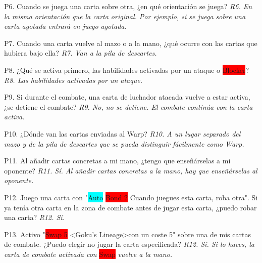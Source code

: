 \documentclass[10pt,a4paper]{article}
\begin{document}
\begin{shaded}
  P6. Cuando se juega una carta sobre otra, ¿en qué orientación se juega? \newline
  \emph{R6. En la misma orientación que la carta original. Por ejemplo, si se juega sobre una carta agotada entrará en juego agotada.} \newline

  P7. Cuando una carta vuelve al mazo o a la mano, ¿qué ocurre con las cartas que hubiera bajo ella? \newline
  \emph{R7. Van a la pila de descartes.} \newline

  P8. ¿Qué se activa primero, las habilidades activadas por un ataque o \colorbox{red}{\color{white}Blocker}? \newline
  \emph{R8. Las habilidades activadas por un ataque.} \newline

  P9. Si durante el combate, una carta de luchador atacada vuelve a estar activa, ¿se detiene el combate? \newline
  \emph{R9. No, no se detiene. El combate continúa con la carta activa.} \newline

  P10. ¿Dónde van las cartas enviadas al Warp? \newline
  \emph{R10. A un lugar separado del mazo y de la pila de descartes que se pueda distinguir fácilmente como Warp.} \newline

  P11. Al añadir cartas concretas a mi mano, ¿tengo que enseñárselas a mi oponente? \newline
  \emph{R11. Sí. Al añadir cartas concretas a la mano, hay que enseñárselas al oponente.} \newline

  P12. Juego una carta con "\colorbox{cyan}{\color{white}Auto} \colorbox{red}{\color{white}Bond 2} Cuando juegues esta carta, roba otra". Si ya tenía otra carta en la zona de combate antes de jugar esta carta, ¿puedo robar una carta? \newline
  \emph{R12. Sí.} \newline

  P13. Activo "\colorbox{red}{\color{white}Swap 5} {\color{yellow}} \textless Goku's Lineage\textgreater con un coste 5" sobre una de mis cartas de combate. ¿Puedo elegir no jugar la carta especificada? \newline
  \emph{R12. Sí. Si lo haces, la carta de combate activada con} \colorbox{red}{\color{white}Swap} \emph{vuelve a la mano.} \newline


\end{shaded}
\end{document}
